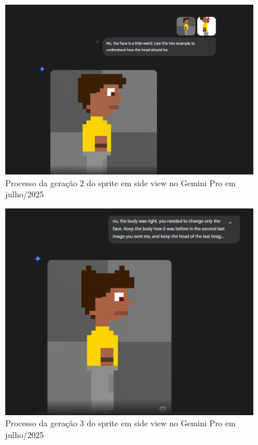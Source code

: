 \begin{figure}[htbp]
    \centering
    \caption{\small Processo da geração 2 do sprite em side view no Gemini Pro em julho/2025}
    \label{fig:geminiPro2}
        \includegraphics[width=0.8\linewidth]{figs/geminiPro/chat1/tela_2.PNG}
\end{figure}

\begin{figure}[htbp]
    \centering
    \caption{\small Processo da geração 3 do sprite em side view no Gemini Pro em julho/2025}
    \label{fig:geminiPro3}
        \includegraphics[width=0.8\linewidth]{figs/geminiPro/chat1/tela3.PNG}
\end{figure}

